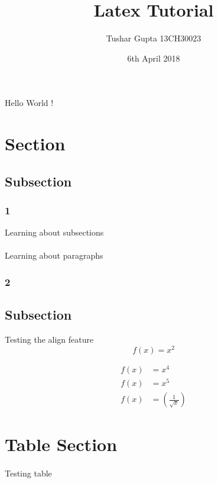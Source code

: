 \documentclass[a4paper,11pt]{article}
\title{Latex Tutorial}
\author{Tushar Gupta 13CH30023}
\date{6th April 2018}
\begin{document}
\maketitle
\newpage
\tableofcontents
\newpage
Hello World !

\section{Section}

\subsection{Subsection}
    \subsubsection{1}
    Learning about subsections 
    \paragraph{}
    Learning about paragraphs
    
    \subsubsection{2}

\subsection{Subsection}
 Testing the align feature
\begin{equation*}
    f(x) = x^2      
\end{equation*}

\begin{align*}
    f(x) &= x^4\\
    f(x) &= x^5\\
    f(x)&= \left(\frac{1}{\sqrt{x}}\right)
\end{align*}
\newpage
\section{Table Section}
\paragraph{}
Testing table
\begin{table}
\end{table}
\end{document}
